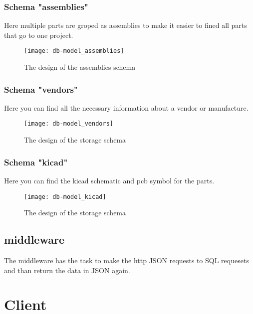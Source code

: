 \newpage
\subsubsection{Schema "assemblies"}
Here multiple parts are groped as assemblies to make it easier to fined all parts that go to one project.

\begin{figure}[h]
	\texttt{[image: db-model\_assemblies]}
	\centering
	\caption{The design of the assemblies schema}
\end{figure}

\newpage
\subsubsection{Schema "vendors"}
Here you can find all the necessary information about a vendor or manufacture.

\begin{figure}[h]
	\texttt{[image: db-model\_vendors]}
	\centering
	\caption{The design of the storage schema}
\end{figure}

\newpage
\subsubsection{Schema "kicad"}
Here you can find the kicad schematic and pcb symbol for the parts.

\begin{figure}[h]
	\texttt{[image: db-model\_kicad]}
	\centering
	\caption{The design of the storage schema}
\end{figure}

\newpage
\subsection{middleware}
The middleware has the task to make the http JSON requests to SQL requesets and than return the data in JSON again.

\newpage
\section{Client}